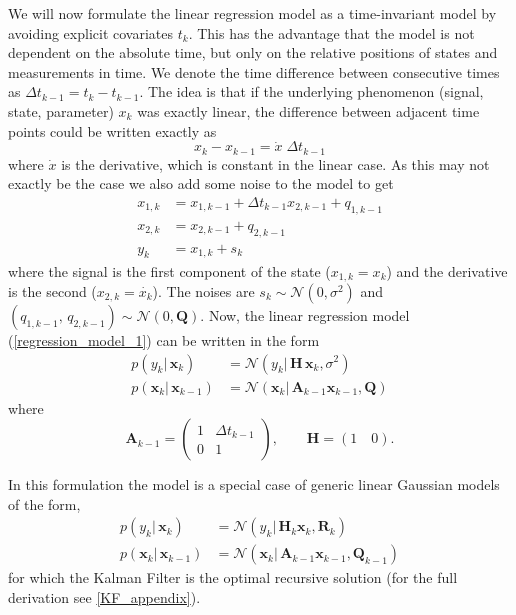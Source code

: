 We will now formulate the
linear regression model as a time-invariant model
by avoiding explicit covariates $t_k$.
This has the advantage that the model is not dependent on
the absolute time, but only on the relative positions of states
and measurements in time.
We denote the time difference between consecutive times as
$\Delta t_{k-1} = t_k - t_{k-1}$. The idea is that if
the underlying phenomenon (signal, state, parameter) $x_k$ was
exactly linear, the difference between adjacent time points could be
written exactly as
$$ x_k - x_{k-1} = \dot{x} \; \Delta t_{k-1} $$
where $\dot{x}$ is the derivative, which is constant in the linear case.
As this may not exactly be the case we also add some noise to the model
to get
\begin{align*}
  x_{1,k} &= x_{1,k-1} + \Delta t_{k-1} x_{2,k-1} + q_{1,k-1} \\
  x_{2,k} &= x_{2,k-1} + q_{2,k-1} \\
  y_k &= x_{1,k} + s_k
\end{align*}
where the signal is the first component of the state
($x_{1,k} = x_k$) and the derivative is the second
($x_{2,k} = \dot{x_k}$).
The noises are $s_k \sim \mathcal{N}(0, \sigma^2)$ and
$(q_{1,k-1},\, q_{2,k-1}) \sim \mathcal{N}(0,\mathbf{Q})$.
Now, the linear regression model (\ref{regression_model_1}) can be written
in the form
\begin{align*}
  p(y_k |\, \mathbf{x}_k) &= \mathcal{N}(y_k |\, \mathbf{H} \,
                          \mathbf{x}_k, \sigma^2) \\
  p(\mathbf{x}_k |\, \mathbf{x}_{k-1}) &= \mathcal{N}(\mathbf{x}_k | \,
                                       \mathbf{A}_{k-1} \mathbf{x}_{k-1},
                                       \mathbf{Q})
\end{align*}
where
$$
\mathbf{A}_{k-1} =
\begin{pmatrix}
  1 & \Delta t_{k-1} \\
  0 & 1
\end{pmatrix}, \quad \quad \mathbf{H} = (1 \quad 0).
$$

In this formulation the model is a special case of generic linear Gaussian
models of the form, 
\begin{align*}
  p(y_k |\, \mathbf{x}_k) &= \mathcal{N}(y_k |\, \mathbf{H}_k \mathbf{x}_k,
                          \mathbf{R}_k) \\
  p(\mathbf{x}_k |\, \mathbf{x}_{k-1}) &= \mathcal{N}(\mathbf{x}_k
                                      |\, \mathbf{A}_{k-1} \mathbf{x}_{k-1},
                                      \mathbf{Q}_{k-1})
\end{align*}
for which the Kalman Filter \citep{Kalman:1960} is the optimal recursive solution
(for the full derivation see  \cref{KF_appendix}).


